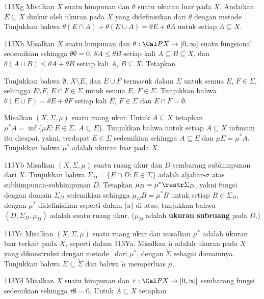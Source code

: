 {\spheader 113Xg Misalkan $X$ suatu himpunan dan $\theta$ suatu ukuran luar
pada $X$. Andaikan $E\subseteq X$ diukur oleh ukuran pada
$X$ yang didefinisikan dari $\theta$ dengan metode \Caratheodory. Tunjukkan bahwa
$\theta(E\cap A)+\theta(E\cup A)=\theta E+\theta A$ untuk setiap
$A\subseteq X$.

\spheader 113Xh Misalkan $X$ suatu himpunan dan $\theta:\Cal PX\to[0,\infty]$ suatu fungsional sedemikian sehingga $\theta\emptyset=0$, $\theta A\le\theta B$ setiap kali $A\subseteq B\subseteq X$, dan $\theta(A\cup B)\le\theta A+\theta B$ setiap kali $A$, $B\subseteq X$. Tetapkan


\noindent Tunjukkan bahwa $\emptyset$, $X\setminus E$, dan $E\cup F$ termasuk dalam
$\Sigma$ untuk semua $E$,
$F\in\Sigma$, sehingga $E\setminus F$, $E\cap F\in\Sigma$ untuk semua $E$,
$F\in\Sigma$. Tunjukkan bahwa $\theta(E\cup F)=\theta E+\theta F$ setiap kali
$E$, $F\in\Sigma$ dan $E\cap F=\emptyset$.

Misalkan $(X,\Sigma,\mu)$ suatu ruang ukur. Untuk $A\subseteq X$
tetapkan $\mu^*A=\inf\{\mu E:E\in\Sigma,\,A\subseteq E\}$. Tunjukkan bahwa
untuk setiap $A\subseteq X$ infimum itu dicapai, yakni, terdapat
$E\in\Sigma$ sedemikian sehingga $A\subseteq E$ dan $\mu E=\mu^*A$. Tunjukkan bahwa
$\mu^*$ adalah ukuran luar pada $X$.

\spheader 113Yb Misalkan $(X,\Sigma,\mu)$ suatu ruang ukur dan $D$
sembarang subhimpunan dari
$X$. Tunjukkan bahwa $\Sigma_D=\{E\cap D:E\in\Sigma\}$ adalah aljabar-$\sigma$
atas subhimpunan-subhimpunan $D$. Tetapkan $\mu_D=\mu^*\restr \Sigma_D$, yakni fungsi dengan
domain $\Sigma_D$ sedemikian sehingga $\mu_DB=\mu^*B$ untuk setiap $B\in\Sigma_D$,
dengan $\mu^*$ didefinisikan seperti dalam (a) di atas; tunjukkan bahwa
$(D,\Sigma_D,\mu_D)$ adalah suatu ruang ukur. ($\mu_D$ adalah {\bf ukuran
subruang} pada $D$.)

\spheader 113Yc Misalkan $(X,\Sigma,\mu)$ suatu ruang ukur dan misalkan
$\mu^*$ adalah
ukuran luar terkait pada $X$, seperti dalam 113Ya. Misalkan $\check\mu$ adalah
ukuran pada $X$ yang dikonstruksi dengan metode \Caratheodory\ dari $\mu^*$,
dengan $\check\Sigma$ sebagai domainnya. Tunjukkan bahwa
$\Sigma\subseteq\check\Sigma$ dan
bahwa $\check\mu$ memperluas $\mu$.

\spheader 113Yd Misalkan $X$ suatu himpunan dan
$\tau:\Cal PX\to[0,\infty]$ sembarang fungsi sedemikian sehingga $\tau\emptyset=0$.
Untuk $A\subseteq X$ tetapkan

}
